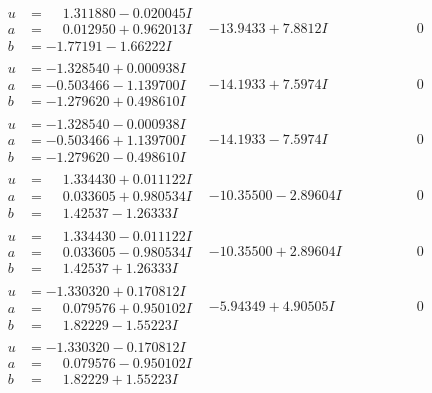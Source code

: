 \documentclass[1p]{elsarticle_modified}
\theoremstyle{definition}
\begin{document}
$$\begin{array}{c|c|c}
\begin{aligned}
u &= \phantom{-}1.311880 - 0.020045 I \\
a &= \phantom{-}0.012950 + 0.962013 I \\
b &= -1.77191 - 1.66222 I\end{aligned}
 & -13.9433 + 7.8812 I & \phantom{-0.000000 } 0 \\ \hline\begin{aligned}
u &= -1.328540 + 0.000938 I \\
a &= -0.503466 - 1.139700 I \\
b &= -1.279620 + 0.498610 I\end{aligned}
 & -14.1933 + 7.5974 I & \phantom{-0.000000 } 0 \\ \hline\begin{aligned}
u &= -1.328540 - 0.000938 I \\
a &= -0.503466 + 1.139700 I \\
b &= -1.279620 - 0.498610 I\end{aligned}
 & -14.1933 - 7.5974 I & \phantom{-0.000000 } 0 \\ \hline\begin{aligned}
u &= \phantom{-}1.334430 + 0.011122 I \\
a &= \phantom{-}0.033605 + 0.980534 I \\
b &= \phantom{-}1.42537 - 1.26333 I\end{aligned}
 & -10.35500 - 2.89604 I & \phantom{-0.000000 } 0 \\ \hline\begin{aligned}
u &= \phantom{-}1.334430 - 0.011122 I \\
a &= \phantom{-}0.033605 - 0.980534 I \\
b &= \phantom{-}1.42537 + 1.26333 I\end{aligned}
 & -10.35500 + 2.89604 I & \phantom{-0.000000 } 0 \\ \hline\begin{aligned}
u &= -1.330320 + 0.170812 I \\
a &= \phantom{-}0.079576 + 0.950102 I \\
b &= \phantom{-}1.82229 - 1.55223 I\end{aligned}
 & -5.94349 + 4.90505 I & \phantom{-0.000000 } 0 \\ \hline\begin{aligned}
u &= -1.330320 - 0.170812 I \\
a &= \phantom{-}0.079576 - 0.950102 I \\
b &= \phantom{-}1.82229 + 1.55223 I\end{aligned}

\end{array}$$
\end{document}
